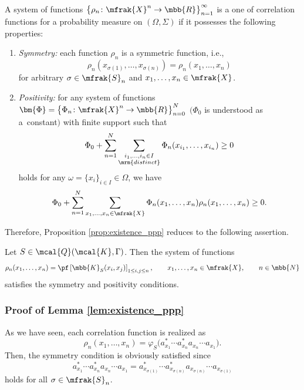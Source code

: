 \begin{Theorem}
A system of functions $\big\{\rho_{n}\colon \mfrak{X}^{n}\to\mbb{R}\big\}_{n=1}^{\infty}$ is a one of correlation functions for a probability measure on $(\Omega,\Sigma)$ if it possesses the following properties:
\begin{enumerate}\itemsep=0pt
\item[$1.$] {\it Symmetry:} each function $\rho_{n}$ is a symmetric function, i.e.,
	\begin{equation*}
		\rho_{n}(x_{\sigma (1)},\dots, x_{\sigma (n)})=\rho_{n}(x_{1},\dots, x_{n})
	\end{equation*}
	for arbitrary $\sigma\in\mfrak{S}_{n}$ and $x_{1},\dots, x_{n}\in\mfrak{X}$.
\item[$2.$] {\it Positivity:} for any system of functions $\bm{\Phi}=\big\{\Phi_{n}\colon \mfrak{X}^{n}\to\mbb{R}\big\}_{n=0}^{N}$ $(\Phi_{0}$ is understood as a~constant$)$ with finite support such that
	\begin{equation}\label{eq:positivity_test_function}
		\Phi_{0}+\sum_{n=1}^{N}\sum_{\substack{i_{1},\dots,i_{n}\in I \\ \mrm{distinct}}}\Phi_{n}(x_{i_{1}},\dots, x_{i_{n}})\ge 0
	\end{equation}
	holds for any $\omega=\{x_{i}\}_{i\in I}\in\Omega$, we have
	\begin{equation*}
		\Phi_{0}+\sum_{n=1}^{N}\sum_{x_{1},\dots, x_{n}\in\mfrak{X}}\Phi_{n}(x_{1},\dots, x_{n})\rho_{n}(x_{1},\dots, x_{n})\ge 0.
	\end{equation*}
\end{enumerate}
\end{Theorem}

Therefore, Proposition \ref{prop:existence_ppp} reduces to the following assertion.
\begin{Lemma}
\label{lem:existence_ppp}
Let $S\in\mcal{Q}(\mcal{K},\Gamma)$. Then the system of functions
\begin{equation*}
	\rho_{n}(x_{1},\dots, x_{n})=\pf \left[\mbb{K}_{S}(x_{i},x_{j})\right]_{1\le i,j\le n}, \qquad x_{1},\dots, x_{n}\in\mfrak{X}, \qquad n\in\mbb{N}
\end{equation*}
satisfies the symmetry and positivity conditions.
\end{Lemma}

\subsubsection{Proof of Lemma \ref{lem:existence_ppp}}
As we have seen, each correlation function is realized as
\begin{equation*}
	\rho_{n}(x_{1},\dots, x_{n})=\varphi_{S}\big(a_{x_{1}}^{\ast}\cdots a_{x_{n}}^{\ast}a_{x_{n}}\cdots a_{x_{1}}\big).
\end{equation*}
Then, the symmetry condition is obviously satisfied since
\begin{equation*}
	a_{x_{1}}^{\ast}\cdots a_{x_{n}}^{\ast}a_{x_{n}}\cdots a_{x_{1}}
	=a_{x_{\sigma (1)}}^{\ast}\cdots a_{x_{\sigma (n)}}^{\ast}a_{x_{\sigma (n)}}\cdots a_{x_{\sigma (1)}}
\end{equation*}
holds for all $\sigma\in\mfrak{S}_{n}$.

